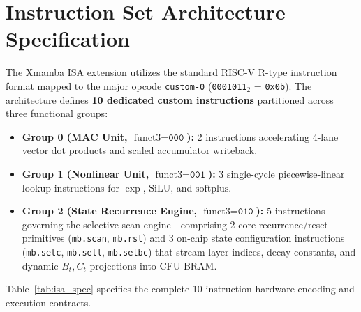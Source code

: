 \documentclass[11pt,a4paper,oneside]{report}
\begin{document}
\section{Instruction Set Architecture Specification}
The Xmamba ISA extension utilizes the standard RISC-V R-type instruction format mapped to the major opcode \texttt{custom-0} (\texttt{0001011}$_2$ = \texttt{0x0b}). The architecture defines \textbf{10 dedicated custom instructions} partitioned across three functional groups:
\begin{itemize}
    \item \textbf{Group 0 (MAC Unit, $\text{funct3}=\texttt{000}$):} 2 instructions accelerating 4-lane vector dot products and scaled accumulator writeback.
    \item \textbf{Group 1 (Nonlinear Unit, $\text{funct3}=\texttt{001}$):} 3 single-cycle piecewise-linear lookup instructions for $\exp$, $\text{SiLU}$, and $\text{softplus}$.
    \item \textbf{Group 2 (State Recurrence Engine, $\text{funct3}=\texttt{010}$):} 5 instructions governing the selective scan engine---comprising 2 core recurrence/reset primitives (\texttt{mb.scan}, \texttt{mb.rst}) and 3 on-chip state configuration instructions (\texttt{mb.setc}, \texttt{mb.setl}, \texttt{mb.setbc}) that stream layer indices, decay constants, and dynamic $B_t, C_t$ projections into CFU BRAM.
\end{itemize}

Table~\ref{tab:isa_spec} specifies the complete 10-instruction hardware encoding and execution contracts.
\end{document}
